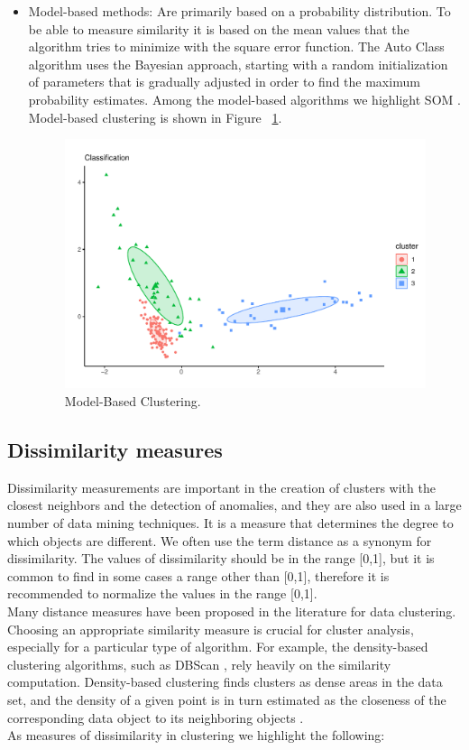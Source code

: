 \begin{itemize}
  \item Model-based methods: Are primarily based on a probability distribution. To be able to measure similarity it is based on the mean values that the algorithm tries to minimize with the square error function. The Auto Class algorithm uses the Bayesian approach, starting with a random initialization of parameters that is gradually adjusted in order to find the maximum probability estimates. Among the model-based algorithms we highlight SOM \citep{R:anbupalam-indranil-xiaojing-george:2006}. Model-based clustering is shown in Figure ~\ref{fig:model}.
    \begin{figure}[htbp]
  \centering
   \includegraphics[width=0.9\linewidth, height=0.16\textheight]{img/model.pdf}
    \caption{Model-Based Clustering.}
    \label{fig:model}%
\end{figure}
\end{itemize}

\subsection {Dissimilarity measures}

Dissimilarity measurements are important in the creation of clusters with the closest neighbors and the detection of anomalies, and they are also used in a large number of data mining techniques. It is a measure that determines the degree to which objects are different. We often use the term distance as a synonym for dissimilarity. The values of dissimilarity should be in the range [0,1], but it is common to find in some cases a range other than [0,1], therefore it is recommended to normalize the values in the range [0,1].
\\
Many distance measures have been proposed in the literature for data clustering. Choosing an appropriate similarity measure is crucial for cluster analysis, especially for a particular type of algorithm. For example, the density-based clustering algorithms, such as DBScan \citep{R:shan:2019}, rely heavily on the similarity computation. Density-based clustering finds clusters as dense areas in the data set, and the density of a given point is in turn estimated as the closeness of the corresponding data object to its neighboring objects \citep{R:shraddha-suchita-others:2011} \citep{R:aliseyed-saeed-teh:2015}.
\\
As measures of dissimilarity in clustering we highlight the following:

